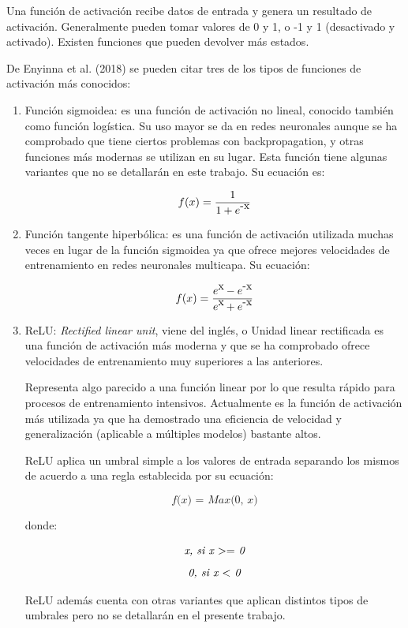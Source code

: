 \documentclass[a4paper,12pt,oneside,spanish]{book}
\begin{document}
Una función de activación recibe datos de entrada y genera un resultado de activación. Generalmente pueden tomar valores de 0 y 1, o -1 y 1 (desactivado y activado). Existen funciones que pueden devolver más estados.\par

De Enyinna et al. (2018) \cite{enyinna} se pueden citar tres de los tipos de funciones de activación más conocidos:

\begin{enumerate}
	\item Función sigmoidea: es una función de activación no lineal, conocido también como función logística. Su uso mayor se da en redes neuronales aunque se ha comprobado que tiene ciertos problemas con backpropagation, y otras funciones más modernas se utilizan en su lugar. Esta función tiene algunas variantes que no se detallarán en este trabajo. Su ecuación es:\par 
	
	\begin{equation}
	f(x) = \frac{1}{1 + e\raisebox{1ex}{-x}} 
	\end{equation}

	\item Función tangente hiperbólica: es una función de activación utilizada muchas veces en lugar de la función sigmoidea ya que ofrece mejores velocidades de entrenamiento en redes neuronales multicapa. Su ecuación:\par 

	\begin{equation}
	f(x) = \frac{e\raisebox{1ex}{x} - e\raisebox{1ex}{-x}}{e\raisebox{1ex}{x} + e\raisebox{1ex}{-x}} 
	\end{equation}

	\item ReLU: \textit{Rectified linear unit}, viene del inglés, o Unidad linear rectificada es una función de activación más moderna y que se ha comprobado ofrece velocidades de entrenamiento muy superiores a las anteriores. \par 
	Representa algo parecido a una función linear por lo que resulta rápido para procesos de entrenamiento intensivos. Actualmente es la función de activación más utilizada ya que ha demostrado una eficiencia de velocidad y  generalización (aplicable a múltiples modelos) bastante altos.\par 
	
	ReLU aplica un umbral simple a los valores de entrada separando los mismos de acuerdo a una regla establecida por su ecuación:\par 

	\[ \textit{f(x) = Max(0, x)} \]
	
	donde:
	
	\[ \textit{x, si x $ >= $ 0} \]
	\[ \textit{0, si x $ < $ 0} \]

	ReLU además cuenta con otras variantes que aplican distintos tipos de umbrales pero no se detallarán en el presente trabajo.\par 
\end{enumerate}	
\end{document}
